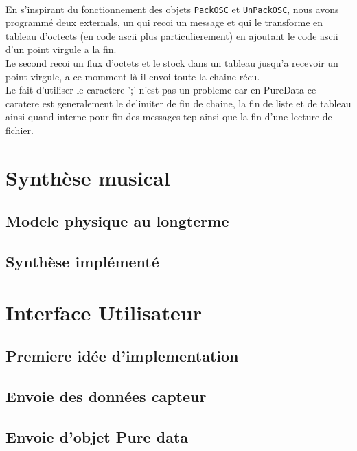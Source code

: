 \documentclass[a4paper, titlepage, oneside, 12pt]{article}%
\begin{document}
\paragraph{}
En s'inspirant du fonctionnement des objets \texttt{PackOSC} et \texttt{UnPackOSC}, nous avons programmé deux externals, un qui recoi un message et qui le transforme en tableau d'octects (en code ascii plus particulierement) en ajoutant le code ascii d'un point virgule a la fin.\\
Le second recoi un flux d'octets et le stock dans un tableau jusqu'a recevoir un point virgule, a ce momment là il envoi toute la chaine récu.\\
Le fait d'utiliser le caractere ';' n'est pas un probleme car en PureData ce caratere est generalement le delimiter de fin de chaine, la fin de liste et de tableau ainsi quand interne pour fin des messages tcp ainsi que la fin d'une lecture de fichier.

\newpage
\section{Synthèse musical}
\subsection{Modele physique au longterme}

\subsection{Synthèse implémenté}

\newpage
\section{Interface Utilisateur}
\subsection{Premiere idée d'implementation}

\subsection{Envoie des données capteur}

\subsection{Envoie d'objet Pure data}
\end{document}
